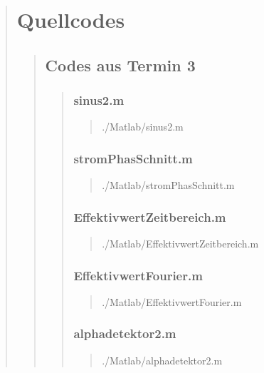 \begin{quote}
\section{Quellcodes}
\begin{quote}
	
	\subsection{Codes aus Termin 3}
	\begin{quote}
	    \subsubsection{sinus2.m}
	    \begin{quote}
	        
	            {./Matlab/sinus2.m}
	    \end{quote}
    
	    \subsubsection{stromPhasSchnitt.m}
	    \begin{quote}
	        
	            {./Matlab/stromPhasSchnitt.m}
	    \end{quote}
    
	    \subsubsection{EffektivwertZeitbereich.m}
	    \begin{quote}
	        
	            {./Matlab/EffektivwertZeitbereich.m}
	    \end{quote}
    
	    \subsubsection{EffektivwertFourier.m}
	    \begin{quote}
	        
	            {./Matlab/EffektivwertFourier.m}
	    \end{quote}
	    \subsubsection{alphadetektor2.m}
        \begin{quote}
            
                {./Matlab/alphadetektor2.m}
        \end{quote}
	\end{quote}
	

\end{quote}
\end{quote}

